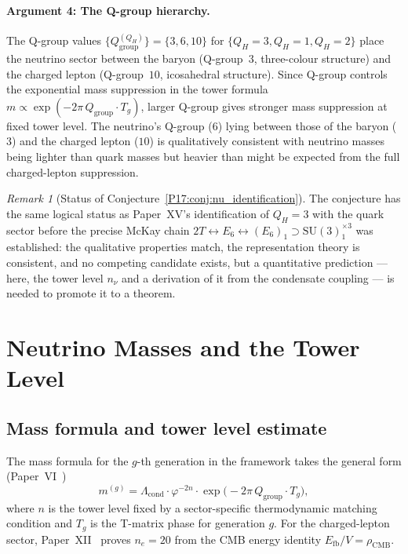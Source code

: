 \documentclass[11pt,a4paper]{article}
\theoremstyle{definition}\newtheorem{definition}[theorem]{Definition}
\theoremstyle{remark}
\newtheorem{remark}[theorem]{Remark}
\newcommand{\vp}{\varphi}
\newcommand{\rCMB}{\rho_{\mathrm{CMB}}}
\newcommand{\SU}{\mathrm{SU}}
\newcommand{\Efb}{E_{\mathrm{fb}}}
\newcommand{\twoT}{2T}
\newcommand{\QH}{Q_H}
\begin{document}
\paragraph{Argument 4: The Q-group hierarchy.}
The Q-group values $\{Q_{\mathrm{group}}^{(\QH)}\}=\{3,6,10\}$
for $\{\QH=3,\QH=1,\QH=2\}$ place the neutrino sector between the
baryon (Q-group~$3$, three-colour structure) and the charged lepton
(Q-group~$10$, icosahedral structure). Since Q-group controls the
exponential mass suppression in the tower formula
$m\propto\exp(-2\pi\,Q_{\mathrm{group}}\cdot T_g)$, larger Q-group
gives stronger mass suppression at fixed tower level. The neutrino's
Q-group ($6$) lying between those of the baryon ($3$) and the charged
lepton ($10$) is qualitatively consistent with neutrino masses being
lighter than quark masses but heavier than might be expected from the
full charged-lepton suppression.

\begin{remark}[Status of Conjecture~\ref{P17:conj:nu_identification}]
\label{P17:rem:conj_status}
The conjecture has the same logical status as Paper~XV's identification
of $\QH=3$ with the quark sector before the precise McKay chain
$\twoT\leftrightarrow E_6\leftrightarrow(E_6)_1\supset\SU(3)_1^{\times3}$
was established: the qualitative properties match, the representation
theory is consistent, and no competing candidate exists, but a
quantitative prediction --- here, the tower level $n_\nu$ and a
derivation of it from the condensate coupling --- is needed to
promote it to a theorem.
\end{remark}

\section{Neutrino Masses and the Tower Level}
\label{P17:sec:masses}

\subsection{Mass formula and tower level estimate}
\label{P17:sec:nu_tower}

The mass formula for the $g$-th generation in the framework takes the
general form (Paper~VI~\cite{Paper6})
\begin{equation}
  m^{(g)} = \Lambda_{\mathrm{cond}}\cdot
    \vp^{-2n}\cdot
    \exp\!\bigl(-2\pi\,Q_{\mathrm{group}}\cdot T_g\bigr),
  \label{P17:eq:mass_formula}
\end{equation}
where $n$ is the tower level fixed by a sector-specific thermodynamic
matching condition and $T_g$ is the T-matrix phase for generation $g$.
For the charged-lepton sector, Paper~XII~\cite{Paper12} proves
$n_e=20$ from the CMB energy identity $\Efb/V=\rCMB$.
\end{document}
